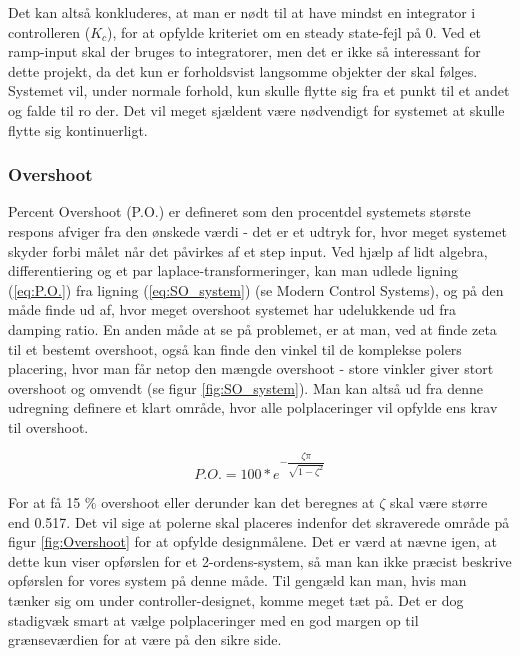 Det kan altså konkluderes, at man er nødt til at have mindst en integrator i controlleren ($K_{c}$), for at opfylde kriteriet om en steady state-fejl på 0. Ved et ramp-input skal der bruges to integratorer, men det er ikke så interessant for dette projekt, da det kun er forholdsvist langsomme objekter der skal følges. Systemet vil, under normale forhold, kun skulle flytte sig fra et punkt til et andet og falde til ro der. Det vil meget sjældent være nødvendigt for systemet at skulle flytte sig kontinuerligt.

\subsubsection{Overshoot}

Percent Overshoot (P.O.) er defineret som den procentdel systemets største respons afviger fra den ønskede værdi - det er et udtryk for, hvor meget systemet skyder forbi målet når det påvirkes af et step input. Ved hjælp af lidt algebra, differentiering og et par laplace-transformeringer, kan man udlede ligning (\ref{eq:P.O.}) fra ligning (\ref{eq:SO_system}) (se Modern Control Systems\cite{ModernControlSystem}), og på den måde finde ud af, hvor meget overshoot systemet har udelukkende ud fra damping ratio. En anden måde at se på problemet, er at man, ved at finde zeta til et bestemt overshoot, også kan finde den vinkel til de komplekse polers placering, hvor man får netop den mængde overshoot - store vinkler giver stort overshoot og omvendt (se figur \ref{fig:SO_system}). Man kan altså ud fra denne udregning definere et klart område, hvor alle polplaceringer vil opfylde ens krav til overshoot. 

\begin{equation}\label{eq:P.O.}
P.O.=100*e^{-\dfrac{\zeta\pi}{\sqrt{1-\zeta^2}}}
\end{equation}

For at få 15 $\%$ overshoot eller derunder kan det beregnes at $\zeta$ skal være større end 0.517. Det vil sige at polerne skal placeres indenfor det skraverede område på figur \ref{fig:Overshoot} for at opfylde designmålene. Det er værd at nævne igen, at dette kun viser opførslen for et 2-ordens-system, så man kan ikke præcist beskrive opførslen for vores system på denne måde. Til gengæld kan man, hvis man tænker sig om under controller-designet, komme meget tæt på. Det er dog stadigvæk smart at vælge polplaceringer med en god margen op til grænseværdien for at være på den sikre side.

